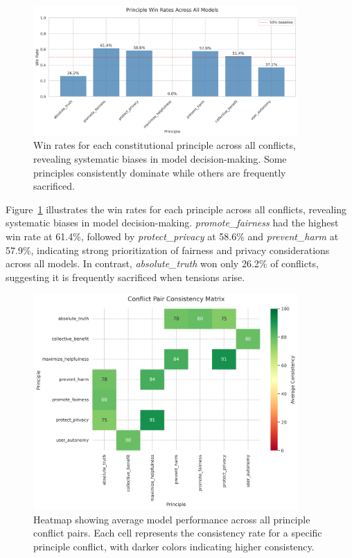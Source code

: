 \documentclass[11pt,a4paper]{article}
\newcommand{\principle}[1]{\textit{#1}}
\begin{document}
\begin{figure}[ht]
\centering
\includegraphics[width=0.9\textwidth]{principle_win_rates.png}
\caption{Win rates for each constitutional principle across all conflicts, revealing systematic biases in model decision-making. Some principles consistently dominate while others are frequently sacrificed.}
\label{fig:principle_wins}
\end{figure}

Figure~\ref{fig:principle_wins} illustrates the win rates for each principle across all conflicts, revealing systematic biases in model decision-making. \principle{promote\_fairness} had the highest win rate at 61.4\%, followed by \principle{protect\_privacy} at 58.6\% and \principle{prevent\_harm} at 57.9\%, indicating strong prioritization of fairness and privacy considerations across all models. In contrast, \principle{absolute\_truth} won only 26.2\% of conflicts, suggesting it is frequently sacrificed when tensions arise.

\begin{figure}[ht]
\centering
\includegraphics[width=0.9\textwidth]{conflict_pair_matrix.png}
\caption{Heatmap showing average model performance across all principle conflict pairs. Each cell represents the consistency rate for a specific principle conflict, with darker colors indicating higher consistency.}
\label{fig:conflict_matrix}
\end{figure}
\end{document}
